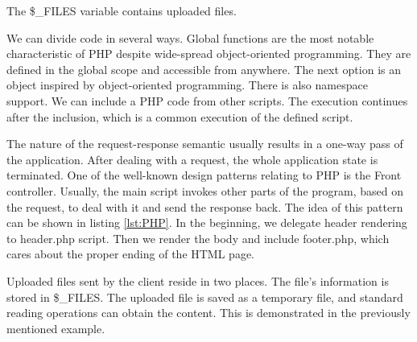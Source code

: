 The \$\_FILES variable contains uploaded files.
\par
{}
We can divide code in several ways.
Global functions are the most notable characteristic of PHP despite wide-spread object-oriented programming.
They are defined in the global scope and accessible from anywhere.
The next option is an object inspired by object-oriented programming.
There is also namespace support.
We can include a PHP code from other scripts. 
The execution continues after the inclusion, which is a common execution of the defined script.
\par
The nature of the request-response semantic usually results in a one-way pass of the application.
After dealing with a request, the whole application state is terminated.
One of the well-known design patterns relating to PHP is the Front controller.
Usually, the main script invokes other parts of the program, based on the request, to deal with it and send the response back.
The idea of this pattern can be shown in listing \ref{lst:PHP}.
In the beginning, we delegate header rendering to header.php script.
Then we render the body and include footer.php, which cares about the proper ending of the HTML page.
\par
{}
Uploaded files sent by the client reside in two places.
The file's information is stored in \$\_FILES.
The uploaded file is saved as a temporary file, and standard reading operations can obtain the content.
This is demonstrated in the previously mentioned example.

